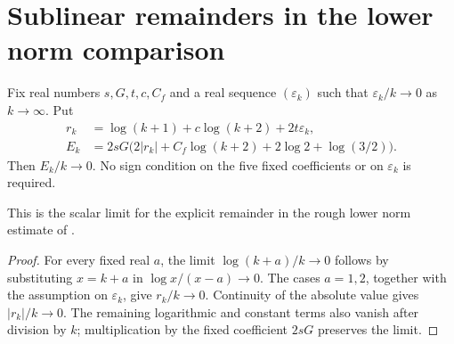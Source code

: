 \section{Sublinear remainders in the lower norm comparison}

\begin{theorem}
  \label{thm:mean_tree_sublinear_remainder}
  \leanok
  Fix real numbers $s,G,t,c,C_f$ and a real sequence $(\varepsilon_k)$
  such that $\varepsilon_k/k\to0$ as $k\to\infty$. Put
  \begin{align*}
    r_k&=\log(k+1)+c\log(k+2)+2t\varepsilon_k,\\
    E_k&=2sG\bigl(2|r_k|+C_f\log(k+2)+2\log2+\log(3/2)\bigr).
  \end{align*}
  Then $E_k/k\to0$. No sign condition on the five fixed coefficients
  or on $\varepsilon_k$ is required.

  This is the scalar limit for the explicit remainder in the rough
  lower norm estimate of \cite[Section~8]{OpenAI2026AreaLaw}.
\end{theorem}
\begin{proof}\leanok
  For every fixed real $a$, the limit
  $\log(k+a)/k\to0$ follows by substituting $x=k+a$ in
  $\log x/(x-a)\to0$. The cases $a=1,2$, together with the assumption
  on $\varepsilon_k$, give $r_k/k\to0$. Continuity of the absolute value
  gives $|r_k|/k\to0$. The remaining logarithmic and constant terms
  also vanish after division by $k$; multiplication by the fixed
  coefficient $2sG$ preserves the limit.
\end{proof}
